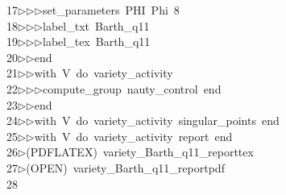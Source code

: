 \begin{tabbing}
17\>$\triangleright$\>$\triangleright$\>$\triangleright$\>set\_parameters\ PHI\ Phi\ 8\ \\[0pt]
18\>$\triangleright$\>$\triangleright$\>$\triangleright$\>label\_txt\ Barth\_q11\ \\[0pt]
19\>$\triangleright$\>$\triangleright$\>$\triangleright$\>label\_tex\ Barth\_q11\ \\[0pt]
20\>$\triangleright$\>$\triangleright$\>end\ \\[0pt]
21\>$\triangleright$\>$\triangleright$\>with\ V\ do\ variety\_activity\ \\[0pt]
22\>$\triangleright$\>$\triangleright$\>$\triangleright$\>compute\_group\ nauty\_control\ end\ \\[0pt]
23\>$\triangleright$\>$\triangleright$\>end\ \\[0pt]
24\>$\triangleright$\>$\triangleright$\>with\ V\ do\ variety\_activity\ singular\_points\ end\ \\[0pt]
25\>$\triangleright$\>$\triangleright$\>with\ V\ do\ variety\_activity\ report\ end\\[0pt]
26\>$\triangleright$\>(PDFLATEX)\ variety\_Barth\_q11\_reporttex\\[0pt]
27\>$\triangleright$\>(OPEN)\ variety\_Barth\_q11\_reportpdf\\[0pt]
28\>\end{tabbing}
